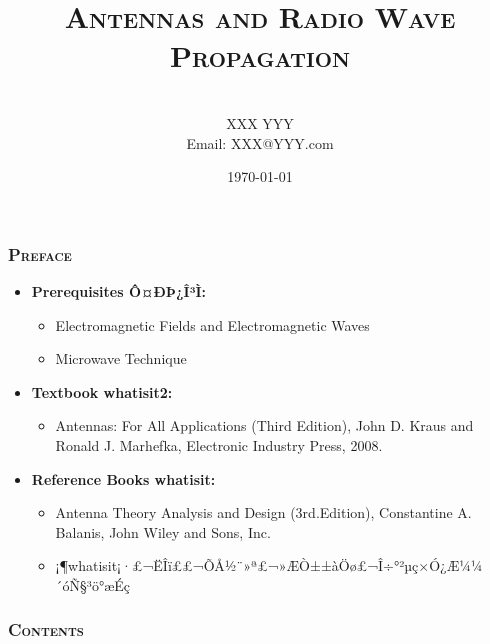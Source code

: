 \documentclass[table,mathserif,12pt]{beamer}%
\title[Antennas and Radio Wave Propagation\quad whatisit] %
{ \textsc{Antennas and Radio Wave Propagation} }
\author[XXX YYY] %
{\quad\\  \large  XXX YYY \\ {\scriptsize Email: XXX@YYY.com}}
\institute[Department of Communication Engineering] %
{Department of Communication Engineering}
\date{\scriptsize{\today} }%
\begin{document}
\begin{frame} %
  \vspace{0.5cm}
  \titlepage
  \hypertarget{beginning}{}
\end{frame}


\begin{frame}
\frametitle{\textsc{Preface}}
\begin{itemize}
\item{} {\bf Prerequisites Ô¤ÐÞ¿Î³Ì:}
    \begin{itemize}
    \item Electromagnetic Fields and Electromagnetic Waves
    \item Microwave Technique
    \end{itemize}\pause

\item{} {\bf Textbook whatisit2:}
    \begin{itemize}
    \item Antennas: For All Applications (Third Edition), John D. Kraus and
    Ronald J. Marhefka, Electronic Industry Press, 2008.
    \end{itemize}\pause

\item{} {\bf Reference Books whatisit:}
    \begin{itemize}
    \item Antenna Theory Analysis and Design (3rd.Edition), Constantine
    A. Balanis, John Wiley and Sons, Inc.
    \item ¡¶whatisit¡·£¬ËÎï££¬ÕÅ½¨»ª£¬»ÆÒ±±àÖø£¬Î÷°²µç×Ó¿Æ¼¼´óÑ§³ö°æÉç
    \end{itemize}
\end{itemize}

\end{frame}


\begin{frame}
  \frametitle{\textsc{Contents}} \vspace{-0.3cm}
  \tableofcontents[hidesubsections]
\end{frame}







%
%
\end{document}
